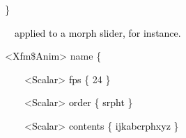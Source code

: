 \documentclass[a4paper]{article}
\newcommand\textstyleOOoComputerKeyWord[1]{\textrm{\textcolor[rgb]{0.0,0.0,0.5019608}{#1}}}
\newcommand\textstyleOOoAssemblerSpecialChar[1]{\textrm{\textcolor[rgb]{0.0,0.5019608,0.0}{#1}}}
\newcommand\textstyleOOoAssemblerIdent[1]{\textrm{\textcolor{black}{#1}}}
\newcommand\textstyleOOoAssemblerDirective[1]{\textrm{\textcolor[rgb]{0.0,0.5019608,1.0}{#1}}}
\newcommand\textstyleOOoAssemblerLiteral[1]{\textrm{\textcolor[rgb]{0.49803922,0.0,0.49803922}{#1}}}
\begin{document}
{\color{black}
\textstyleOOoComputerKeyWord{\textcolor{black}{\ \ }}\textstyleOOoAssemblerSpecialChar{\}}}

\clearpage{\color{black}
\textstyleOOoComputerKeyWord{\textcolor{black}{\ \ \ \ This is a table of scalar values, one per frame. \ This may be}}}

{\color{black}
\textstyleOOoComputerKeyWord{\textcolor{black}{\ \ \ \ applied to a morph slider, for instance.}}}


\bigskip

{\color{black}
\textstyleOOoComputerKeyWord{\textcolor{black}{\ \ }}\textstyleOOoAssemblerSpecialChar{{\textless}}\textstyleOOoAssemblerIdent{Xfm}\textstyleOOoAssemblerSpecialChar{\$}\textstyleOOoAssemblerIdent{Anim}\textstyleOOoAssemblerSpecialChar{{\textgreater}}\textstyleOOoComputerKeyWord{\textcolor{black}{
}}\textstyleOOoAssemblerDirective{name}\textstyleOOoComputerKeyWord{\textcolor{black}{
}}\textstyleOOoAssemblerSpecialChar{\{}}

{\color{black}
\textstyleOOoComputerKeyWord{\textcolor{black}{\ \ \ \ \ \ }}\textstyleOOoAssemblerSpecialChar{{\textless}}\textstyleOOoAssemblerIdent{Scalar}\textstyleOOoAssemblerSpecialChar{{\textgreater}}\textstyleOOoComputerKeyWord{\textcolor{black}{
}}\textstyleOOoAssemblerIdent{fps}\textstyleOOoComputerKeyWord{\textcolor{black}{
}}\textstyleOOoAssemblerSpecialChar{\{}\textstyleOOoComputerKeyWord{\textcolor{black}{
}}\textstyleOOoAssemblerLiteral{24}\textstyleOOoComputerKeyWord{\textcolor{black}{
}}\textstyleOOoAssemblerSpecialChar{\}}}

{\color{black}
\textstyleOOoComputerKeyWord{\textcolor{black}{\ \ \ \ \ \ }}\textstyleOOoAssemblerSpecialChar{{\textless}}\textstyleOOoAssemblerIdent{Scalar}\textstyleOOoAssemblerSpecialChar{{\textgreater}}\textstyleOOoComputerKeyWord{\textcolor{black}{
}}\textstyleOOoAssemblerIdent{order}\textstyleOOoComputerKeyWord{\textcolor{black}{
}}\textstyleOOoAssemblerSpecialChar{\{}\textstyleOOoComputerKeyWord{\textcolor{black}{
}}\textstyleOOoAssemblerIdent{srpht}\textstyleOOoComputerKeyWord{\textcolor{black}{
}}\textstyleOOoAssemblerSpecialChar{\}}}

{\color{black}
\textstyleOOoComputerKeyWord{\textcolor{black}{\ \ \ \ \ \ }}\textstyleOOoAssemblerSpecialChar{{\textless}}\textstyleOOoAssemblerIdent{Scalar}\textstyleOOoAssemblerSpecialChar{{\textgreater}}\textstyleOOoComputerKeyWord{\textcolor{black}{
}}\textstyleOOoAssemblerIdent{contents}\textstyleOOoComputerKeyWord{\textcolor{black}{
}}\textstyleOOoAssemblerSpecialChar{\{}\textstyleOOoComputerKeyWord{\textcolor{black}{
}}\textstyleOOoAssemblerIdent{ijkabcrphxyz}\textstyleOOoComputerKeyWord{\textcolor{black}{
}}\textstyleOOoAssemblerSpecialChar{\}}}
\end{document}

